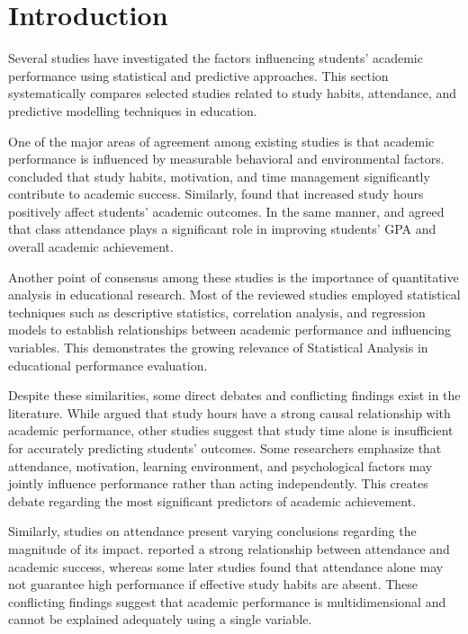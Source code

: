 \documentclass[12pt]{report}
\begin{document}
	\section{Introduction}
	Several studies have investigated the factors influencing students’ academic performance using statistical and predictive approaches. This section systematically compares selected studies related to study habits, attendance, and predictive modelling techniques in education.
	
	One of the major areas of agreement among existing studies is that academic performance is influenced by measurable behavioral and environmental factors. \citet{Crede2008} concluded that study habits, motivation, and time management significantly contribute to academic success. Similarly, \citet{Stine2008} found that increased study hours positively affect students' academic outcomes. In the same manner, \citet{Romer1993} and \citet{Marburger2006} agreed that class attendance plays a significant role in improving students' GPA and overall academic achievement.
	
	Another point of consensus among these studies is the importance of quantitative analysis in educational research. Most of the reviewed studies employed statistical techniques such as descriptive statistics, correlation analysis, and regression models to establish relationships between academic performance and influencing variables. This demonstrates the growing relevance of Statistical Analysis in educational performance evaluation.
	
	Despite these similarities, some direct debates and conflicting findings exist in the literature. While \citet{Stine2008} argued that study hours have a strong causal relationship with academic performance, other studies suggest that study time alone is insufficient for accurately predicting students' outcomes. Some researchers emphasize that attendance, motivation, learning environment, and psychological factors may jointly influence performance rather than acting independently. This creates debate regarding the most significant predictors of academic achievement.
	
	Similarly, studies on attendance present varying conclusions regarding the magnitude of its impact. \citet{Romer1993} reported a strong relationship between attendance and academic success, whereas some later studies found that attendance alone may not guarantee high performance if effective study habits are absent. These conflicting findings suggest that academic performance is multidimensional and cannot be explained adequately using a single variable.
	
\end{document}
